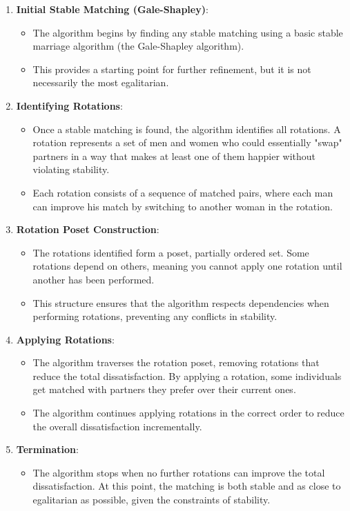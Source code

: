 \begin{enumerate}
    \item \textbf{Initial Stable Matching (Gale-Shapley)}: 
    \begin{itemize}
        \item The algorithm begins by finding any stable matching using a basic stable marriage algorithm (the Gale-Shapley algorithm).
        \item This provides a starting point for further refinement, but it is not necessarily the most egalitarian.
    \end{itemize}
    
    \item \textbf{Identifying Rotations}:
    \begin{itemize}
        \item Once a stable matching is found, the algorithm identifies all rotations. A rotation represents a set of men and women who could essentially "swap" partners in a way that makes at least one of them happier without violating stability.
        \item Each rotation consists of a sequence of matched pairs, where each man can improve his match by switching to another woman in the rotation.
    \end{itemize}
    
    \item \textbf{Rotation Poset Construction}:
    \begin{itemize}
        \item The rotations identified form a poset, partially ordered set. Some rotations depend on others, meaning you cannot apply one rotation until another has been performed.
        \item This structure ensures that the algorithm respects dependencies when performing rotations, preventing any conflicts in stability.
    \end{itemize}
    
    \item \textbf{Applying Rotations}:
    \begin{itemize}
        \item The algorithm traverses the rotation poset, removing rotations that reduce the total dissatisfaction. By applying a rotation, some individuals get matched with partners they prefer over their current ones.
        \item The algorithm continues applying rotations in the correct order to reduce the overall dissatisfaction incrementally.
    \end{itemize}
    
    \item \textbf{Termination}:
    \begin{itemize}
        \item The algorithm stops when no further rotations can improve the total dissatisfaction. At this point, the matching is both stable and as close to egalitarian as possible, given the constraints of stability.
    \end{itemize}
\end{enumerate}

